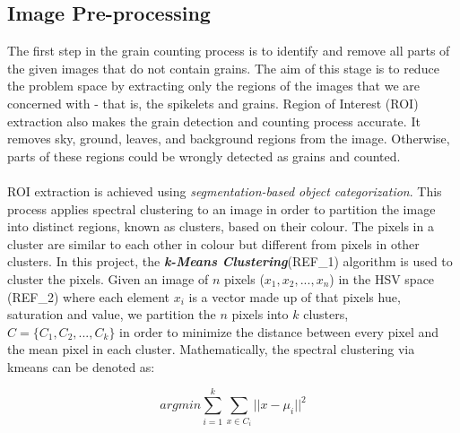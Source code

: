 \subsection{Image Pre-processing}
The first step in the grain counting process is to identify and remove all parts of the given images that do not contain grains. The aim of this stage is to reduce the problem space by extracting only the regions of the images that we are concerned with - that is, the spikelets and grains. Region of Interest (ROI) extraction also makes the grain detection and counting process accurate. It removes sky, ground, leaves, and background regions from the image. Otherwise, parts of these regions could be wrongly detected as grains and counted.\\ \\
%
ROI extraction is achieved using \textit{segmentation-based object categorization}. This process applies spectral clustering to an image in order to partition the image into distinct regions, known as clusters, based on their colour. The pixels in a cluster are similar to each other in colour but different from pixels in other clusters. In this project, the \textit{\textbf{k-Means Clustering}}(REF\_1) algorithm is used to cluster the pixels. Given an image of $n$ pixels ($x_1, x_2, ..., x_n$) in the HSV space (REF\_2) where each element $x_i$ is a vector made up of that pixels hue, saturation and value, we partition the $n$ pixels into $k$ clusters, $C = \{C_1, C_2, ..., C_k\}$ in order to minimize the distance between every pixel and the mean pixel in each cluster. Mathematically, the spectral clustering via kmeans can be denoted as:

\begin{equation}
argmin \sum_{i=1}^{k}\sum_{x\in C_i} ||x - \mu_i||^2
\end{equation}

